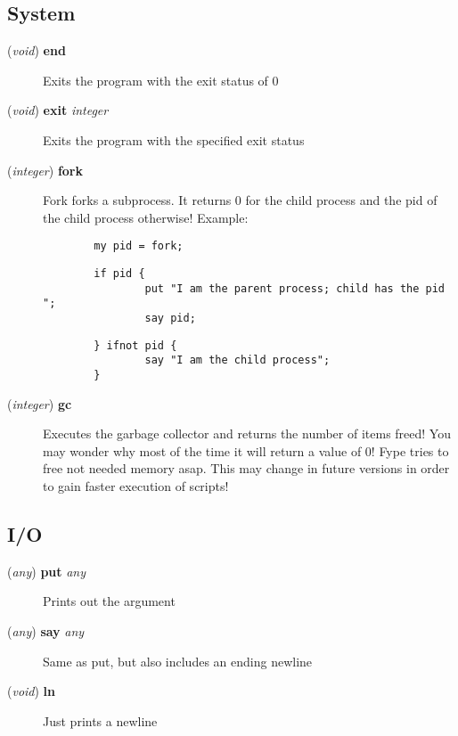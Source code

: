 \subsection*{System\label{System}}
\begin{description}

\item[{(\textit{void}) \textbf{end}}] \mbox{}

Exits the program with the exit status of 0


\item[{(\textit{void}) \textbf{exit} \textit{integer}}] \mbox{}

Exits the program with the specified exit status


\item[{(\textit{integer}) \textbf{fork}}] \mbox{}

Fork forks a subprocess. It returns 0 for the child process and the pid of the
child process otherwise! Example:

\begin{verbatim}
        my pid = fork;
\end{verbatim}
\begin{verbatim}
        if pid {
                put "I am the parent process; child has the pid ";
                say pid;
\end{verbatim}
\begin{verbatim}
        } ifnot pid {
                say "I am the child process";
        }
\end{verbatim}

\item[{(\textit{integer}) \textbf{gc}}] \mbox{}

Executes the garbage collector and returns the number of items freed! You may
wonder why most of the time it will return a value of 0! Fype tries to free not
needed memory asap. This may change in future versions in order to gain faster
execution of scripts!

\end{description}
\subsection*{I/O\label{I_O}}
\begin{description}

\item[{(\textit{any}) \textbf{put} \textit{any}}] \mbox{}

Prints out the argument


\item[{(\textit{any}) \textbf{say} \textit{any}}] \mbox{}

Same as put, but also includes an ending newline


\item[{(\textit{void}) \textbf{ln}}] \mbox{}

Just prints a newline

\end{description}
